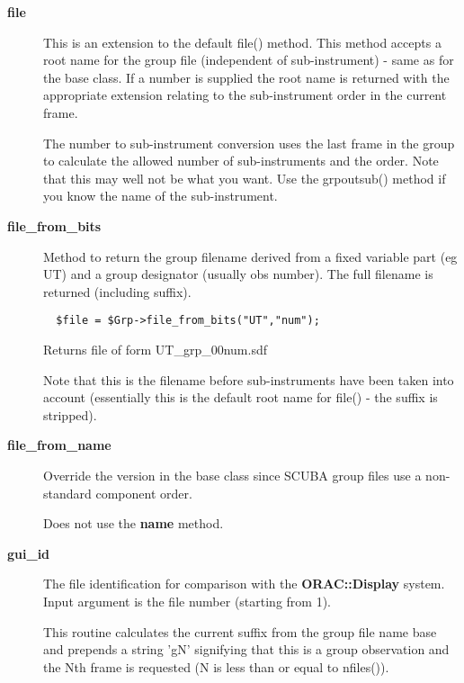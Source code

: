 \begin{description}
\begin{description}
\begin{description}
\item[{\textbf{file}}] \mbox{}

This is an extension to the default file() method.
This method accepts a root name for the group file
(independent of sub-instrument) - same as for the base 
class. If a number is supplied the root name is returned
with the appropriate extension relating to the 
sub-instrument order in the current frame.



The number to sub-instrument conversion uses the last frame in the
group to calculate the allowed number of sub-instruments and
the order. Note that this may well not be what you want.
Use the grpoutsub() method if you know the name of the sub-instrument.


\item[{\textbf{file\_from\_bits}}] \mbox{}

Method to return the group filename derived from a fixed
variable part (eg UT) and a group designator (usually obs
number). The full filename is returned (including suffix).

\begin{verbatim}
  $file = $Grp->file_from_bits("UT","num");
\end{verbatim}


Returns file of form UT\_grp\_00num.sdf



Note that this is the filename before sub-instruments
have been taken into account (essentially this is the
default root name for file() - the suffix is stripped).


\item[{\textbf{file\_from\_name}}] \mbox{}

Override the version in the base class since SCUBA group files
use a non-standard component order.



Does not use the \textbf{name} method.


\item[{\textbf{gui\_id}}] \mbox{}

The file identification for comparison with the \textbf{ORAC::Display}
system. Input argument is the file number (starting from 1).



This routine calculates the current suffix from the group file
name base and prepends a string 'gN' signifying that this is
a group observation and the Nth frame is requested (N is less than
or equal to nfiles()).




\end{description}
\end{description}
\end{description}

